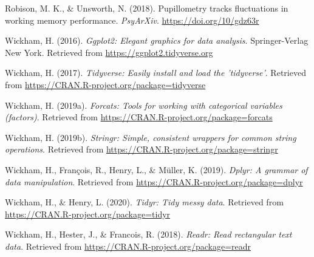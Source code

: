 \documentclass[english,man]{apa6}
\begin{document}
\leavevmode\hypertarget{ref-robisonPupillometryTracksFluctuations2018}{}%
Robison, M. K., \& Unsworth, N. (2018). Pupillometry tracks fluctuations in working memory performance. \emph{PsyArXiv}. \url{https://doi.org/10/gdz63r}

\leavevmode\hypertarget{ref-R-ggplot2}{}%
Wickham, H. (2016). \emph{Ggplot2: Elegant graphics for data analysis}. Springer-Verlag New York. Retrieved from \url{https://ggplot2.tidyverse.org}

\leavevmode\hypertarget{ref-R-tidyverse}{}%
Wickham, H. (2017). \emph{Tidyverse: Easily install and load the 'tidyverse'}. Retrieved from \url{https://CRAN.R-project.org/package=tidyverse}

\leavevmode\hypertarget{ref-R-forcats}{}%
Wickham, H. (2019a). \emph{Forcats: Tools for working with categorical variables (factors)}. Retrieved from \url{https://CRAN.R-project.org/package=forcats}

\leavevmode\hypertarget{ref-R-stringr}{}%
Wickham, H. (2019b). \emph{Stringr: Simple, consistent wrappers for common string operations}. Retrieved from \url{https://CRAN.R-project.org/package=stringr}

\leavevmode\hypertarget{ref-R-dplyr}{}%
Wickham, H., François, R., Henry, L., \& Müller, K. (2019). \emph{Dplyr: A grammar of data manipulation}. Retrieved from \url{https://CRAN.R-project.org/package=dplyr}

\leavevmode\hypertarget{ref-R-tidyr}{}%
Wickham, H., \& Henry, L. (2020). \emph{Tidyr: Tidy messy data}. Retrieved from \url{https://CRAN.R-project.org/package=tidyr}

\leavevmode\hypertarget{ref-R-readr}{}%
Wickham, H., Hester, J., \& Francois, R. (2018). \emph{Readr: Read rectangular text data}. Retrieved from \url{https://CRAN.R-project.org/package=readr}

\endgroup
\end{document}
